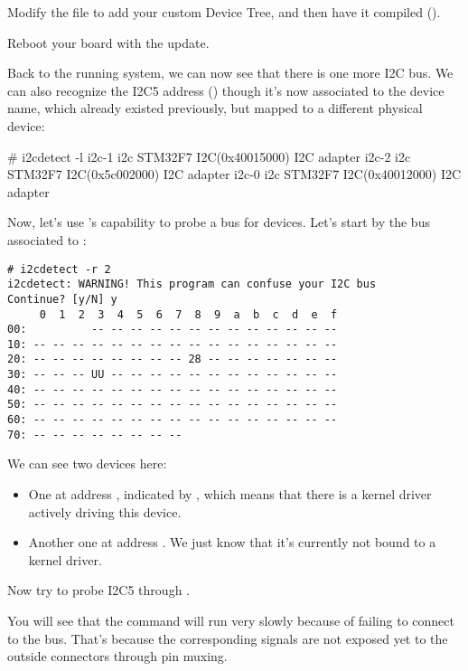 {Modify the  file to add your custom
Device Tree, and then have it compiled ().

Reboot your board with the update.

Back to the running system, we can now see that there is one more
I2C bus. We can also recognize the I2C5 address ()
though it's now associated to the  device name, which
already existed previously, but mapped to a different physical device:

\begin{bashinput}
# i2cdetect -l
i2c-1	i2c             STM32F7 I2C(0x40015000)                 I2C adapter
i2c-2	i2c             STM32F7 I2C(0x5c002000)                 I2C adapter
i2c-0	i2c             STM32F7 I2C(0x40012000)                 I2C adapter
\end{bashinput}

Now, let's use 's capability to probe a bus for devices.
Let's start by the bus associated to :

\begin{verbatim}
# i2cdetect -r 2
i2cdetect: WARNING! This program can confuse your I2C bus
Continue? [y/N] y
     0  1  2  3  4  5  6  7  8  9  a  b  c  d  e  f
00:          -- -- -- -- -- -- -- -- -- -- -- -- --
10: -- -- -- -- -- -- -- -- -- -- -- -- -- -- -- --
20: -- -- -- -- -- -- -- -- 28 -- -- -- -- -- -- --
30: -- -- -- UU -- -- -- -- -- -- -- -- -- -- -- --
40: -- -- -- -- -- -- -- -- -- -- -- -- -- -- -- --
50: -- -- -- -- -- -- -- -- -- -- -- -- -- -- -- --
60: -- -- -- -- -- -- -- -- -- -- -- -- -- -- -- --
70: -- -- -- -- -- -- -- --
\end{verbatim}

We can see two devices here:
\begin{itemize}
\item One at address , indicated by ,
      which means that there is a kernel driver actively
      driving this device.
\item Another one at address . We just know that
      it's currently not bound to a kernel driver.
\end{itemize}

Now try to probe I2C5 through .

You will see that the command will run very slowly because of failing to
connect to the bus. That's because the corresponding signals are
not exposed yet to the outside connectors through pin muxing.

}
